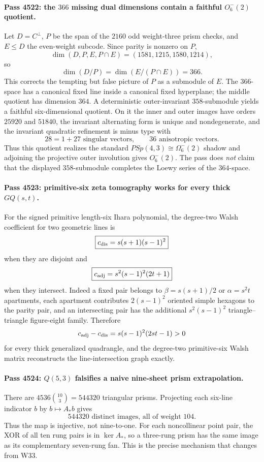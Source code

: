 \paragraph{Pass 4522: the $366$ missing dual dimensions contain a faithful $O^-_6(2)$ quotient.}
Let $D=C^\perp$, $P$ be the span of the $2160$ odd weight-three prism checks,
and $E\le D$ the even-weight subcode.  Since parity is nonzero on $P$,
\[
\boxed{\dim(D,P,E,P\cap E)=(1581,1215,1580,1214),}
\]
so
\[
\boxed{\dim(D/P)=\dim(E/(P\cap E))=366.}
\]
This corrects the tempting but false picture of $P$ as a submodule of $E$.
The $366$-space has a canonical fixed line inside a canonical fixed hyperplane;
the middle quotient has dimension $364$.  A deterministic outer-invariant
$358$-submodule yields a faithful six-dimensional quotient.  On it the inner
and outer images have orders $25920$ and $51840$, the invariant alternating
form is unique and nondegenerate, and the invariant quadratic refinement is
minus type with
\[
28=1+27\text{ singular vectors},\qquad36\text{ anisotropic vectors}.
\]
Thus this quotient realizes the standard
$PSp(4,3)\cong\Omega^-_6(2)$ shadow and adjoining the projective outer
involution gives $O^-_6(2)$.  The pass does \emph{not} claim that the displayed
$358$-submodule completes the Loewy series of the $364$-space.

\paragraph{Pass 4523: primitive-six zeta tomography works for every thick $GQ(s,t)$.}
For the signed primitive length-six Ihara polynomial, the degree-two Walsh
coefficient for two geometric lines is
\[
\boxed{c_{\rm dis}=s(s+1)(s-1)^2}
\]
when they are disjoint and
\[
\boxed{c_{\rm adj}=s^2(s-1)^2(2t+1)}
\]
when they intersect.  Indeed a fixed pair belongs to
$\beta=s(s+1)/2$ or $\alpha=s^2t$ apartments, each apartment contributes
$2(s-1)^2$ oriented simple hexagons to the parity pair, and an intersecting pair
has the additional $s^2(s-1)^2$ triangle--triangle figure-eight family.
Therefore
\[
 c_{\rm adj}-c_{\rm dis}=s(s-1)^2(2st-1)>0
\]
for every thick generalized quadrangle, and the degree-two primitive-six Walsh
matrix reconstructs the line-intersection graph exactly.

\paragraph{Pass 4524: $Q(5,3)$ falsifies a naive nine-sheet prism extrapolation.}
There are $4536\binom{10}{3}=544320$ triangular prisms.  Projecting each
six-line indicator $b$ by $b\mapsto A_*b$ gives
\[
\boxed{544320\text{ distinct images, all of weight }104.}
\]
Thus the map is injective, not nine-to-one.  For each noncollinear point pair,
the XOR of all ten rung pairs is in $\ker A_*$, so a three-rung prism has the
same image as its complementary seven-rung fan.  This is the precise mechanism
that changes from W33.

